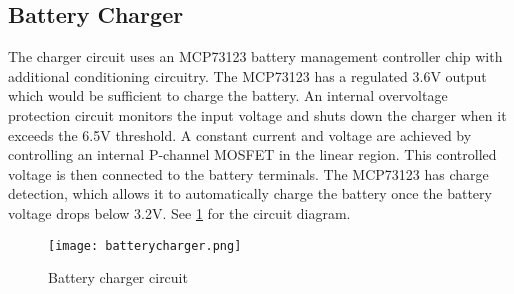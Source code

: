 \subsection{Battery Charger}
The charger circuit uses an MCP73123 battery management controller chip with additional conditioning circuitry. The MCP73123 has a regulated 3.6V output which would be sufficient to charge the battery. An internal overvoltage protection circuit monitors the input voltage and shuts down the charger when it exceeds the 6.5V threshold. A constant current and voltage are achieved by controlling an internal P-channel MOSFET in the linear region. This controlled voltage is then connected to the battery terminals. The MCP73123 has charge detection, which allows it to automatically charge the battery once the battery voltage drops below 3.2V. See \ref{fig:charger} for the circuit diagram.

\begin{figure}[!h]
    \centering
    \texttt{[image: batterycharger.png]}
    \caption{Battery charger circuit}
    \label{fig:charger}
\end{figure}